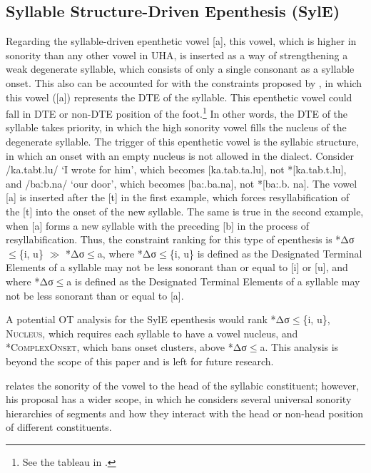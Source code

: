 \documentclass[output=paper,colorlinks,citecolor=brown]{langscibook}
\begin{document}
\subsection{Syllable Structure-Driven Epenthesis (SylE)} \label{syl}

Regarding the syllable-driven epenthetic vowel [a], this vowel, which is higher in sonority than any other vowel in UHA, is inserted as a way of strengthening a weak degenerate syllable, which consists of only a single consonant as a syllable onset. This also can be accounted for with the constraints proposed by \citet[68]{DeLacy2006}, in which this vowel ([a]) represents the DTE of the syllable. This epenthetic vowel could fall in DTE or non-DTE position of the foot.\footnote{See the tableau in .} In other words, the DTE of the syllable takes priority, in which the high sonority vowel fills the nucleus of the degenerate syllable. The trigger of this epenthetic vowel is the syllabic structure, in which an onset with an empty nucleus is not allowed  in the dialect. Consider /ka.tabt.lu/ ‘I wrote for him’, which becomes [ka.tab.ta.lu], not *[ka.tab.t.lu], and /baːb.na/ ‘our door’, which becomes [ba:.ba.na], not *[ba:.b. na]. The vowel [a] is inserted after the [t] in the first example, which forces resyllabification of the [t] into the onset of the new syllable. The same is true in the second example, when [a] forms a new syllable with the preceding [b] in the process of resyllabification. Thus, the constraint ranking for this type of epenthesis is *Δσ${\leq}$\{i, u\}  $\gg$  *Δσ${\leq}$a, where *Δσ${\leq}$\{i, u\} is defined as the Designated Terminal Elements of a syllable may not be less sonorant than or equal to [i] or [u], and where *Δσ${\leq}$a is defined as the Designated Terminal Elements of a syllable may not be less sonorant than or equal to [a].

A potential OT analysis for the SylE epenthesis would rank *Δσ${\leq}$\{i, u\}, \textsc{Nucleus}, which requires each syllable to have a vowel nucleus, and *\textsc{ComplexOn\-set}, which bans onset clusters, above *Δσ${\leq}$a. This analysis is beyond the scope of this paper and is left for future research.

\citet{DeLacy2006} relates the sonority of the vowel to the head of the syllabic constituent; however, his proposal has a wider scope, in which he considers several universal sonority hierarchies of segments and how they interact with the head or non-head position of different constituents.
\end{document}
